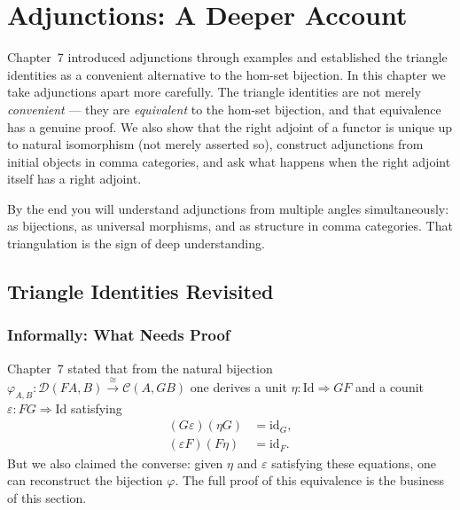 
\chapter{Adjunctions: A Deeper Account}

\begin{overviewbox}
Chapter~7 introduced adjunctions through examples and established the triangle
identities as a convenient alternative to the hom-set bijection. In this chapter
we take adjunctions apart more carefully. The triangle identities are not merely
\emph{convenient} --- they are \emph{equivalent} to the hom-set bijection, and
that equivalence has a genuine proof. We also show that the right adjoint of a
functor is unique up to natural isomorphism (not merely asserted so), construct
adjunctions from initial objects in comma categories, and ask what happens when
the right adjoint itself has a right adjoint.

By the end you will understand adjunctions from multiple angles
simultaneously: as bijections, as universal morphisms, and as structure in
comma categories. That triangulation is the sign of deep understanding.
\end{overviewbox}


\section{Triangle Identities Revisited}
\label{sec:triangle-revisited}

\subsection{Informally: What Needs Proof}

Chapter~7 stated that from the natural bijection
$\varphi_{A,B} : \mathcal{D}(FA, B) \xrightarrow{\cong} \mathcal{C}(A, GB)$
one derives a unit $\eta : \mathrm{Id} \Rightarrow GF$ and a counit
$\varepsilon : FG \Rightarrow \mathrm{Id}$ satisfying
\begin{align*}
  (G\varepsilon)(\eta G) &= \mathrm{id}_G, \\
  (\varepsilon F)(F\eta) &= \mathrm{id}_F.
\end{align*}
But we also claimed the converse: given $\eta$ and $\varepsilon$ satisfying
these equations, one can reconstruct the bijection $\varphi$. The full proof
of this equivalence is the business of this section.


